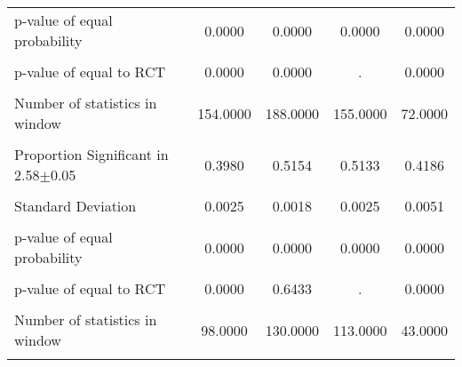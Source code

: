 {\begin{tabular}{l*{4}{c}}
p-value of equal probability&   0.0000         &   0.0000         &   0.0000         &   0.0000         \\
                &                  &                  &                  &                  \\
p-value of equal to RCT&   0.0000         &   0.0000         &        .         &   0.0000         \\
                &                  &                  &                  &                  \\
Number of statistics in window& 154.0000         & 188.0000         & 155.0000         &  72.0000         \\
                &                  &                  &                  &                  \\
\hline Proportion Significant in 2.58$\pm$0.05&   0.3980         &   0.5154         &   0.5133         &   0.4186         \\
                &                  &                  &                  &                  \\
Standard Deviation&   0.0025         &   0.0018         &   0.0025         &   0.0051         \\
                &                  &                  &                  &                  \\
p-value of equal probability&   0.0000         &   0.0000         &   0.0000         &   0.0000         \\
                &                  &                  &                  &                  \\
p-value of equal to RCT&   0.0000         &   0.6433         &        .         &   0.0000         \\
                &                  &                  &                  &                  \\
Number of statistics in window&  98.0000         & 130.0000         & 113.0000         &  43.0000         \\
                &                  &                  &                  &                  \\
\hline\hline
\end{tabular}
}
